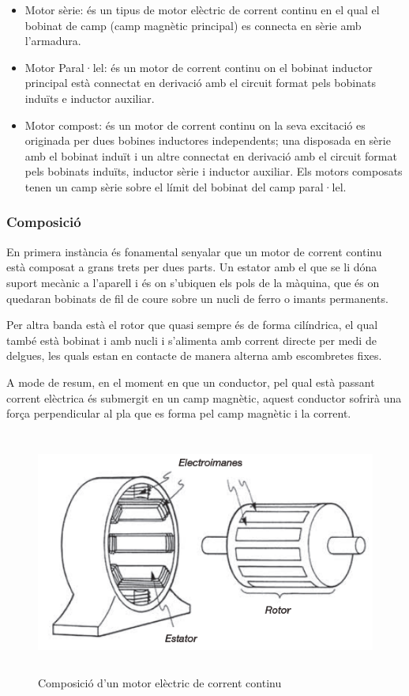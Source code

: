\begin{itemize}
    \item Motor sèrie: és un tipus de motor elèctric de corrent continu en el qual el bobinat de camp (camp magnètic principal) es connecta en sèrie amb l'armadura.
    \item Motor Paral·lel: és un motor de corrent continu on el bobinat inductor principal està connectat en derivació amb el circuit format pels bobinats induïts e inductor auxiliar.
    \item Motor compost: és un motor de corrent continu on la seva \newline excitació es originada per dues bobines inductores independents; una disposada en sèrie amb el bobinat induït i un altre connectat en derivació amb el circuit format pels bobinats induïts, inductor sèrie i inductor auxiliar. Els motors composats tenen un camp sèrie sobre el límit del bobinat del camp paral·lel. 
\end{itemize}

\subsubsection{Composició}
En primera instància és fonamental senyalar que un motor de corrent continu està composat a grans trets per dues parts. Un estator amb el que se li dóna suport mecànic a l'aparell i és on s'ubiquen els pols de la màquina, que és on quedaran bobinats de fil de coure sobre un nucli de ferro o imants permanents.

Per altra banda està el rotor que quasi sempre és de forma cilíndrica, el qual també està bobinat i amb nucli i s'alimenta amb corrent directe per medi de delgues, les quals estan en contacte de manera alterna amb escombretes fixes.

A mode de resum, en el moment en que un conductor, pel qual està passant corrent elèctrica és submergit en un camp magnètic, aquest conductor sofrirà una força perpendicular al pla que es forma pel camp magnètic i la corrent.

\begin{figure}[H]
		\centering
    	\includegraphics[width=\textwidth, height=8cm]{Motors/rotorestator.png}
     	\caption{Composició d'un motor elèctric de corrent continu}
\end{figure}

